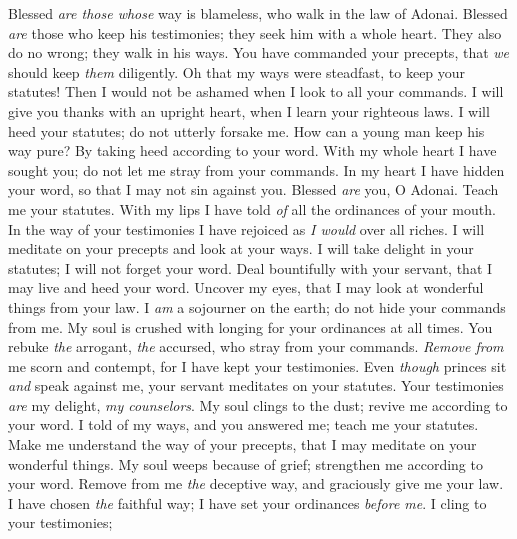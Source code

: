 \begin{biblechapter} %
 Blessed \textit{are those whose} way is blameless, 
who walk in the law of Adonai.
\verse Blessed \textit{are} those who keep his testimonies; 
they seek him with a whole heart.
\verse They also do no wrong; 
they walk in his ways.
\verse You have commanded your precepts, 
that \textit{we} should keep \textit{them} diligently.
\verse Oh that my ways were steadfast, 
to keep your statutes!
\verse Then I would not be ashamed 
when I look to all your commands.
\verse I will give you thanks with an upright heart, 
when I learn your righteous laws.
\verse I will heed your statutes; 
do not utterly forsake me.
 How can a young man keep his way pure? 
By taking heed according to your word.
\verse With my whole heart I have sought you; 
do not let me stray from your commands.
\verse In my heart I have hidden your word, 
so that I may not sin against you.
\verse Blessed \textit{are} you, O Adonai. 
Teach me your statutes.
\verse With my lips I have told \textit{of} 
all the ordinances of your mouth.
\verse In the way of your testimonies I have rejoiced 
as \textit{I would} over all riches.
\verse I will meditate on your precepts 
and look at your ways.
\verse I will take delight in your statutes; 
I will not forget your word.
 Deal bountifully with your servant, that I may live 
and heed your word.
\verse Uncover my eyes, that I may look at 
wonderful things from your law.
\verse I \textit{am} a sojourner on the earth; 
do not hide your commands from me.
\verse My soul is crushed with longing 
for your ordinances at all times.
\verse You rebuke \textit{the} arrogant, \textit{the} accursed, 
who stray from your commands.
\verse \textit{Remove from} me scorn and contempt, 
for I have kept your testimonies.
\verse Even \textit{though} princes sit \textit{and} speak against me, 
your servant meditates on your statutes.
\verse Your testimonies \textit{are} my delight, 
\textit{my counselors}.
 My soul clings to the dust; 
revive me according to your word.
\verse I told of my ways, and you answered me; 
teach me your statutes.
\verse Make me understand the way of your precepts, 
that I may meditate on your wonderful things.
\verse My soul weeps because of grief; 
strengthen me according to your word.
\verse Remove from me \textit{the} deceptive way, 
and graciously give me your law.
\verse I have chosen \textit{the} faithful way; 
I have set your ordinances \textit{before me}.
\verse I cling to your testimonies; 

\end{biblechapter}
